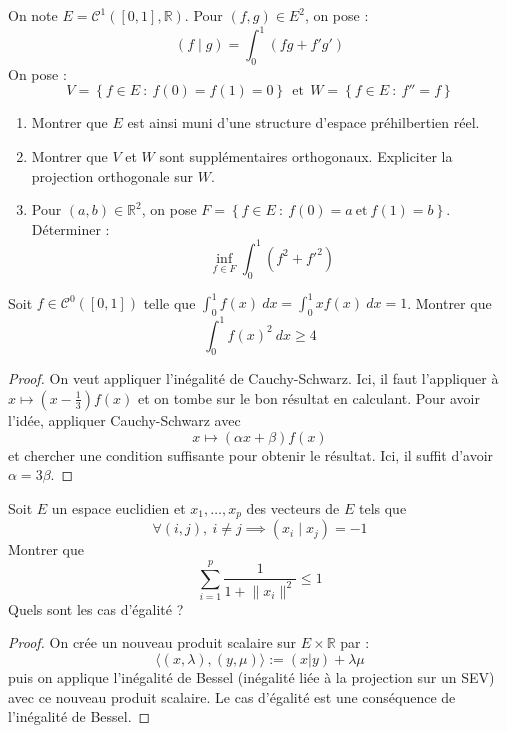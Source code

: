 \documentclass[french,a4paper]{article}
\newcommand{\R}{\mathbb{R}}
\theoremstyle{plain}
\theoremstyle{definition}
\theoremstyle{remark}
\begin{document}
\begin{ex}{}
	On note $E=\mathcal{C}^1([0,1],\R)$. Pour $(f,g)\in E^2$, on pose : $$(f\mid g)=\int_{0}^{1}(fg+f'g')$$ On pose : $$V=\left\{f\in E\ : \ f(0)=f(1)=0\right\}\ \ \text{et}\ \ W=\left\{f\in E\ : \ f''=f\right\}$$
	\begin{enumerate}
		\item Montrer que $E$ est ainsi muni d'une structure d'espace préhilbertien réel.
		\item Montrer que $V$ et $W$ sont supplémentaires orthogonaux. Expliciter la projection orthogonale sur $W$.
		\item Pour $(a,b)\in\R^2$, on pose $F=\left\{f\in E\ : \ f(0)=a\ \text{et}\ f(1)=b\right\}$. Déterminer : $$\underset{f\in F}{\inf}\int_{0}^{1}(f^2+f'^2)$$
	\end{enumerate}
\end{ex}

\begin{ex}{}
	Soit $f\in\mathcal{C}^{0}([0,1])$ telle que $\displaystyle\int_{0}^{1}f(x)\ dx=\int_{0}^{1}xf(x)\ dx=1$. Montrer que $$\int_{0}^{1}f(x)^2\ dx\geqslant 4$$
\end{ex}
\begin{proof}
	On veut appliquer l'inégalité de Cauchy-Schwarz. Ici, il faut l'appliquer à $x\mapsto \displaystyle\left(x-\frac{1}{3}\right)f(x)$ et on tombe sur le bon résultat en calculant. Pour avoir l'idée, appliquer Cauchy-Schwarz avec $$x\mapsto(\alpha x+\beta)f(x)$$ et chercher une condition suffisante pour obtenir le résultat. Ici, il suffit d'avoir $\alpha =3\beta$.
\end{proof}

\begin{ex}{}
	Soit $E$ un espace euclidien et $x_1,\ldots,x_p$ des vecteurs de $E$ tels que $$\forall (i,j),\ i\ne j\implies (x_i\mid x_j)=-1$$ Montrer que $$\sum_{i=1}^{p}\frac{1}{1+\lVert x_i\rVert^2}\leqslant 1$$ Quels sont les cas d'égalité ?
\end{ex}
\begin{proof}
	On crée un nouveau produit scalaire sur $E\times\R$ par : $$\langle (x,\lambda),(y,\mu)\rangle:=(x|y)+\lambda\mu$$ puis on applique l'inégalité de Bessel (inégalité liée à la projection sur un SEV) avec ce nouveau produit scalaire. Le cas d'égalité est une conséquence de l'inégalité de Bessel.
\end{proof}
\end{document}
